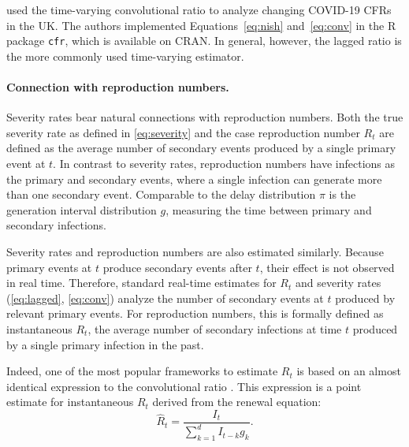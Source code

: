 \documentclass{article}
\renewcommand{\hat}{\widehat} %
\newcommand{\djmcomment}[1]{{\color{teal}[DJM: #1]}}
\newcommand{\jmgcomment}[1]{{\color{cyan}[JMG: #1]}}
\begin{document}
\citet{cfr_package} used the time-varying convolutional ratio to analyze changing COVID-19 CFRs in the UK. The authors implemented Equations~\eqref{eq:nish} and~\eqref{eq:conv} in the R package \texttt{cfr}, which is available on CRAN. In general, however, the lagged ratio is the more commonly used time-varying estimator.



\paragraph{Connection with reproduction numbers.} Severity rates bear natural connections with reproduction numbers. Both the true
severity rate as defined in \eqref{eq:severity} and the case
reproduction number $R_t$ are defined as the average number of secondary events
produced by a
single primary event at $t$. In contrast to severity rates, reproduction numbers
have infections as the primary and secondary events, where a single infection
can generate more than one secondary event. Comparable to the delay distribution
$\pi$ is the generation interval distribution $g$, measuring the time between primary and
secondary infections. 


Severity rates and reproduction numbers are also estimated similarly. Because primary events at $t$ produce secondary events after $t$, their effect is not observed in real time. Therefore, standard real-time estimates for $R_t$ and severity rates (\ref{eq:lagged}, \ref{eq:conv}) analyze the number of secondary events at $t$ produced by relevant primary events. 
For reproduction numbers, this is formally defined as instantaneous $R_t$, the average number of secondary infections at time $t$ produced by a single primary infection in the past. 

Indeed, one of the most popular frameworks to estimate $R_t$ is based on an almost identical expression to the convolutional ratio \citep{fraser2007,wallinga2007how,cori2013new,rtestim}. This expression is a point estimate for instantaneous $R_t$ derived from the renewal equation:
\begin{equation}\label{eq:instRt}
    \hat{R}_t = \frac{I_t}{\sum_{k=1}^d I_{t-k}g_k}.
\end{equation}
\end{document}
